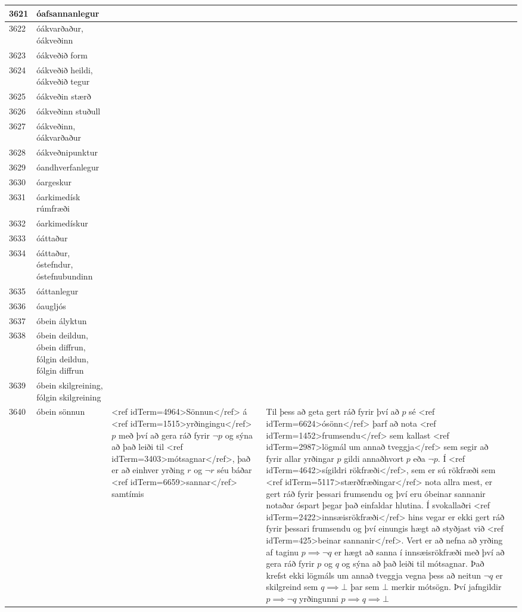 \begin{longtable}{p{}|p{}|p{}|p{}|p{}}
\hline
3621 & óafsannanlegur &  &  &  \\
\hline
3622 & óákvarðaður, óákveðinn &  &  &  \\
\hline
3623 & óákveðið form &  &  &  \\
\hline
3624 & óákveðið heildi, óákveðið tegur &  &  &  \\
\hline
3625 & óákveðin stærð &  &  &  \\
\hline
3626 & óákveðinn stuðull &  &  &  \\
\hline
3627 & óákveðinn, óákvarðaður &  &  &  \\
\hline
3628 & óákveðnipunktur &  &  &  \\
\hline
3629 & óandhverfanlegur &  &  &  \\
\hline
3630 & óargeskur &  &  &  \\
\hline
3631 & óarkimedísk rúmfræði &  &  &  \\
\hline
3632 & óarkimedískur &  &  &  \\
\hline
3633 & óáttaður &  &  &  \\
\hline
3634 & óáttaður, óstefndur, óstefnubundinn &  &  &  \\
\hline
3635 & óáttanlegur &  &  &  \\
\hline
3636 & óaugljós &  &  &  \\
\hline
3637 & óbein ályktun &  &  &  \\
\hline
3638 & óbein deildun, óbein diffrun, fólgin deildun, fólgin diffrun &  &  &  \\
\hline
3639 & óbein skilgreining, fólgin skilgreining &  &  &  \\
\hline
3640 & óbein sönnun & <ref idTerm=4964>Sönnun</ref> á <ref idTerm=1515>yrðingingu</ref> $p$ með því að gera ráð fyrir $\lnot p$ og sýna að það leiði til <ref idTerm=3403>mótsagnar</ref>, það er að einhver yrðing $r$ og $\lnot r$ séu báðar <ref idTerm=6659>sannar</ref> samtímis & Til þess að geta gert ráð fyrir því að $p$ sé <ref idTerm=6624>ósönn</ref> þarf að nota <ref idTerm=1452>frumsendu</ref> sem kallast <ref idTerm=2987>lögmál um annað tveggja</ref> sem segir að fyrir allar yrðingar $p$ gildi annaðhvort $p$ eða $\lnot p$. Í <ref idTerm=4642>sígildri rökfræði</ref>, sem er sú rökfræði sem <ref idTerm=5117>stærðfræðingar</ref> nota allra mest, er gert ráð fyrir þessari frumsendu og því eru óbeinar sannanir notaðar óspart þegar það einfaldar hlutina. Í svokallaðri <ref idTerm=2422>innsæisrökfræði</ref> hins vegar er ekki gert ráð fyrir þessari frumsendu og því einungis hægt að styðjast við <ref idTerm=425>beinar sannanir</ref>. Vert er að nefna að yrðing af taginu $p \implies \lnot q$ er hægt að sanna í innsæisrökfræði með því að gera ráð fyrir $p$ og $q$ og sýna að það leiði til mótsagnar. Það krefst ekki lögmáls um annað tveggja vegna þess að neitun $\lnot q$ er skilgreind sem $q \implies \bot$ þar sem $\bot$ merkir mótsögn. Því jafngildir $p \implies \lnot q$ yrðingunni $p \implies q \implies \bot$ &  \\

\end{longtable}
